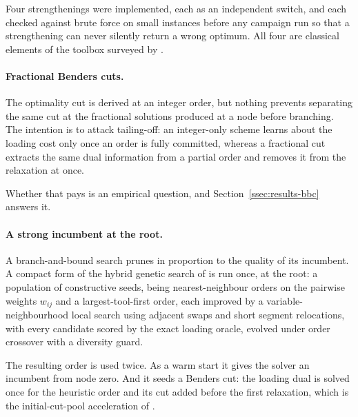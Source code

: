 Four strengthenings were implemented, each as an independent switch, and each checked
against brute force on small instances before any campaign run so that a strengthening
can never silently return a wrong optimum. All four are classical elements of the
toolbox surveyed by \citet{Rahmaniani2017}.

\paragraph{Fractional Benders cuts.}
The optimality cut is derived at an integer order, but nothing prevents separating the
same cut at the fractional solutions produced at a node before branching. The
intention is to attack tailing-off: an integer-only scheme learns about the loading
cost only once an order is fully committed, whereas a fractional cut extracts the same
dual information from a partial order and removes it from the relaxation at once.

Whether that pays is an empirical question, and Section~\ref{ssec:results-bbc} answers
it.

\paragraph{A strong incumbent at the root.}
A branch-and-bound search prunes in proportion to the quality of its incumbent. A
compact form of the hybrid genetic search of \citet{Mecler2021} is run once, at the
root: a population of constructive seeds, being nearest-neighbour orders on the
pairwise weights $w_{ij}$ and a largest-tool-first order, each improved by a
variable-neighbourhood local search using adjacent swaps and short segment
relocations, with every candidate scored by the exact loading oracle, evolved under
order crossover with a diversity guard.

The resulting order is used twice. As a warm start it gives the solver an incumbent
from node zero. And it seeds a Benders cut: the loading dual is solved once for the
heuristic order and its cut added before the first relaxation, which is the
initial-cut-pool acceleration of \citet{Rahmaniani2017}.

